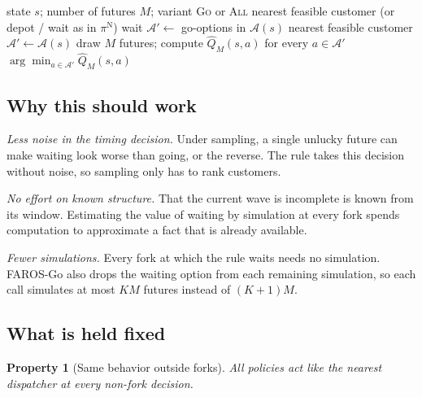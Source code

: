 \documentclass[5p,times,authoryear]{elsarticle}
\newtheorem{property}{Property}
\begin{document}
\begin{algorithm}[t]
\caption{Wait first, then sample (one decision)}
\label{alg:method}
\begin{algorithmic}[1]
\Require state $s$; number of futures $M$; variant \textsc{Go} or \textsc{All}
  \State \Return nearest feasible customer (or depot / wait as in $\pi^{\mathrm{N}}$)
\EndIf
{}
  \State \Return wait 
\EndIf
{}
  \State $\mathcal{A}'\gets$ go-options in $\mathcal{A}(s)$
   \Return nearest feasible customer \EndIf
\Else
  \State $\mathcal{A}'\gets\mathcal{A}(s)$ 
\EndIf
\State draw $M$ futures; compute $\widehat{Q}_M(s,a)$ for every $a\in\mathcal{A}'$ 
\State \Return $\arg\min_{a\in\mathcal{A}'}\widehat{Q}_M(s,a)$
\end{algorithmic}
\end{algorithm}

\subsection{Why this should work}

\emph{Less noise in the timing decision.} Under sampling, a single unlucky future can make waiting look worse than going, or the reverse. The rule takes this decision without noise, so sampling only has to rank customers.

\emph{No effort on known structure.} That the current wave is incomplete is known from its window. Estimating the value of waiting by simulation at every fork spends computation to approximate a fact that is already available.

\emph{Fewer simulations.} Every fork at which the rule waits needs no simulation. FAROS-Go also drops the waiting option from each remaining simulation, so each call simulates at most $K M$ futures instead of $(K+1)M$.

\subsection{What is held fixed}

\begin{property}[Same behavior outside forks]\label{prop:backbone}
All policies act like the nearest dispatcher at every non-fork decision.
\end{property}
\end{document}
